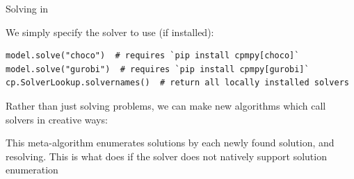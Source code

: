 \documentclass{cons-beamer}
\begin{document}
\begin{flashcardcpmpy} 
	\begin{frame}[fragile]{Solving in \CPMpy}   %

		We simply specify the solver to use (if installed):

		\begin{lstlisting}[language=cpmpy]
model.solve("choco")  # requires `pip install cpmpy[choco]`
model.solve("gurobi")  # requires `pip install cpmpy[gurobi]`
cp.SolverLookup.solvernames()  # return all locally installed solvers\end{lstlisting}

		Rather than just solving problems, we can make new algorithms which call solvers in creative ways:

		

		This meta-algorithm enumerates solutions by  each newly found solution, and resolving.
		This is what  does if the solver does not natively support solution enumeration
	\end{frame}
\end{flashcardcpmpy}

%
%
%
%
%
% 		
%
\end{document}
